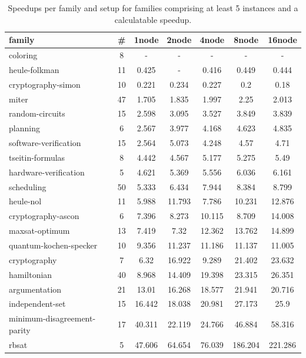 \documentclass[12pt,a4paper,twoside]{scrartcl}
\numberwithin{equation}{section}
\begin{document}
\begin{table}[!h]
  \center
  \begin{tabular}{ lcccccc }
    \toprule
    family	&	\#	&	1node	&	2node	&	4node	&	8node	&	16node\\
    \midrule
    coloring	&	8	&	-	&	-	&	-	&	-	&	-\\
    heule-folkman	&	11	&	0.425	&	-	&	0.416	&	0.449	&	0.444\\
    cryptography-simon	&	10	&	0.221	&	0.234	&	0.227	&	0.2	&	0.18\\
    miter	&	47	&	1.705	&	1.835	&	1.997	&	2.25	&	2.013\\
    random-circuits	&	15	&	2.598	&	3.095	&	3.527	&	3.849	&	3.839\\
    planning	&	6	&	2.567	&	3.977	&	4.168	&	4.623	&	4.835\\
    software-verification	&	15	&	2.564	&	5.073	&	4.248	&	4.57	&	4.71\\
    tseitin-formulas	&	8	&	4.442	&	4.567	&	5.177	&	5.275	&	5.49\\
    hardware-verification	&	5	&	4.621	&	5.369	&	5.556	&	6.036	&	6.161\\
    scheduling	&	50	&	5.333	&	6.434	&	7.944	&	8.384	&	8.799\\
    heule-nol	&	11	&	5.988	&	11.793	&	7.786	&	10.231	&	12.876\\
    cryptography-ascon	&	6	&	7.396	&	8.273	&	10.115	&	8.709	&	14.008\\
    maxsat-optimum	&	13	&	7.419	&	7.32	&	12.362	&	13.762	&	14.899\\
    quantum-kochen-specker	&	10	&	9.356	&	11.237	&	11.186	&	11.137	&	11.005\\
    cryptography	&	7	&	6.32	&	16.922	&	9.289	&	21.402	&	23.632\\
    hamiltonian	&	40	&	8.968	&	14.409	&	19.398	&	23.315	&	26.351\\
    argumentation	&	21	&	13.01	&	16.268	&	18.577	&	21.941	&	20.716\\
    independent-set	&	15	&	16.442	&	18.038	&	20.981	&	27.173	&	25.9\\
    minimum-disagreement-parity	&	17	&	40.311	&	22.119	&	24.766	&	46.884	&	58.316\\
    rbsat	&	5	&	47.606	&	64.654	&	76.039	&	186.204	&	221.286\\
    \bottomrule
  \end{tabular}
  \caption{Speedups per family and setup for families comprising at least 5 instances and a calculatable speedup.}
  \label{tab:speedupsSignificantFamilies}
\end{table}
\end{document}
